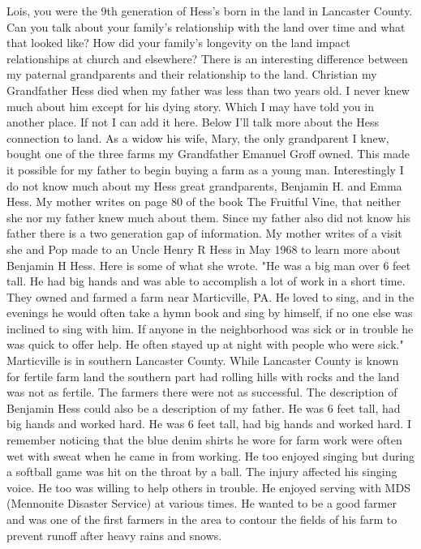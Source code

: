 Lois, you were the 9th generation of Hess's born in the land in Lancaster County. Can you talk about your family's relationship with the land over time and what that looked like? How did your family's longevity on the land impact relationships at church and elsewhere?
There is an interesting difference between my paternal grandparents and their relationship to the land. Christian my Grandfather Hess died when my father was less than two years old. I never knew much about him except for his dying story. Which I may have told you in another place. If not I can add it here. Below I'll talk more about the Hess connection to land. As a widow his wife, Mary, the only grandparent I knew, bought one of the three farms my Grandfather Emanuel Groff owned. This made it possible for my father to begin buying a farm as a young man.
Interestingly I do not know much about my Hess great grandparents, Benjamin H. and Emma Hess. My mother writes on page 80 of the book The Fruitful Vine, that neither she nor my father knew much about them. Since my father also did not know his father there is a two generation gap of information. 
My mother writes of a visit she and Pop made to an Uncle Henry R Hess in May 1968 to learn more about Benjamin H Hess. Here is some of what she wrote. 
      "He was a big man over 6 feet tall. He had big hands and was able to accomplish a lot of work in a short time. They owned and farmed a farm near Marticville, PA. He loved to sing, and in the evenings he would often take a hymn book and sing by himself, if no one else was inclined to sing with him. If anyone in the neighborhood was sick or in trouble he was quick to offer help. He often stayed up at night with people who were sick."
Marticville is in southern Lancaster County. While Lancaster County is known for fertile farm land the southern part had rolling hills with rocks and the land was not as fertile. The farmers there were not as successful. 
The description of Benjamin Hess could also be a description of my father. He was 6 feet tall, had big hands and worked hard. He was 6 feet tall, had big hands and worked hard. I remember noticing that the blue denim shirts he wore for farm work were often wet with sweat when he came in from working. He too enjoyed singing but during a softball game was hit on the throat by a ball. The injury affected his singing voice. He too was willing to help others in trouble. He enjoyed serving with MDS (Mennonite Disaster Service) at various times. He wanted to be a good farmer and was one of the first farmers in the area to contour the fields of his farm to prevent runoff after heavy rains and snows.
